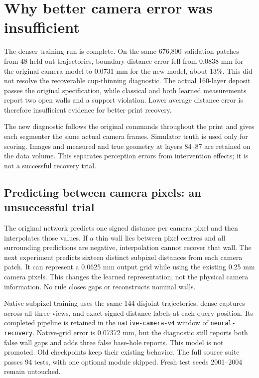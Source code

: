 \documentclass[10pt,letterpaper]{article}
\begin{document}
\clearpage
\section{Why better camera error was insufficient}

The denser training run is complete. On the same 676,800 validation patches from
48 held-out trajectories, boundary distance error fell from 0.0838 mm for the
original camera model to 0.0731 mm for the new model, about 13\%. This did not
resolve the recoverable cup-thinning diagnostic. The actual 160-layer deposit
passes the original specification, while classical and both learned measurements
report two open walls and a support violation. Lower average distance error is
therefore insufficient evidence for better print recovery.

The new diagnostic follows the original commands throughout the print and gives
each segmenter the same actual camera frames. Simulator truth is used only for
scoring. Images and measured and true geometry at layers 84--87 are retained on
the data volume. This separates perception errors from intervention effects;
it is not a successful recovery trial.

\subsection*{Predicting between camera pixels: an unsuccessful trial}
The original network predicts one signed distance per camera pixel and then
interpolates those values. If a thin wall lies between pixel centres and all
surrounding predictions are negative, interpolation cannot recover that wall.
The next experiment predicts sixteen distinct subpixel distances from each
camera patch. It can represent a 0.0625 mm output grid while using the existing
0.25 mm camera pixels. This changes the learned representation, not the physical
camera information. No rule closes gaps or reconstructs nominal walls.

Native subpixel training uses the same 144 disjoint trajectories, dense captures
across all three views, and exact signed-distance labels at each query position.
Its completed pipeline is retained in the \texttt{native-camera-v4} window of
\texttt{neural-recovery}. Native-grid error is 0.07372 mm, but the diagnostic still
reports both false wall gaps and adds three false base-hole reports. This model
is not promoted. Old checkpoints keep their existing behavior. The full source
suite passes 94 tests, with one optional module skipped. Fresh test seeds
2001--2004 remain untouched.
\end{document}
